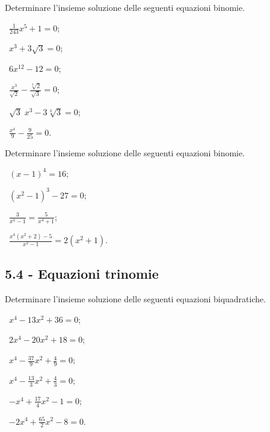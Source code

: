 \begin{esercizio}[\Ast]
 \label{ese:5.19}
Determinare l'insieme soluzione delle seguenti equazioni binomie.
\begin{multicols}{3}
 \begin{enumeratea}
 \item~$\frac 1{243}x^5+1=0$;
 \item~$x^3+3\sqrt 3=0$;
 \item~$6x^{12}-12=0$;
 \item~$\frac{x^3}{\sqrt 2}-\frac{\sqrt[3]2}{\sqrt 3}=0$;
 \item~$\sqrt 3\;x^3-3\sqrt[3]3=0$;
 \item~$\frac{x^4} 9-\frac 9{25}=0$.
 \end{enumeratea}
 \end{multicols}
\end{esercizio}

\begin{esercizio}
\label{ese:5.20}
Determinare l'insieme soluzione delle seguenti equazioni binomie.
\begin{multicols}{2}
 \begin{enumeratea}
 \item~$(x-1)^4=16$;
 \item~$(x^2-1)^3-27=0$;
 \item~$ \frac 3{x^4-1}=\frac 5{x^4+1} $;
 \item~$ \frac{x^4(x^2+2)-5}{x^2-1}=2(x^2+1) $.
 \end{enumeratea}
 \end{multicols}
\end{esercizio}

\subsection*{5.4 - Equazioni trinomie}

\begin{esercizio}[\Ast]
\label{ese:5.21}
Determinare l'insieme soluzione delle seguenti equazioni biquadratiche.
\begin{multicols}{3}
 \begin{enumeratea}
 \item~$x^4-13x^2+36=0$;
 \item~$2x^4-20x^2+18=0$;
 \item~$x^4-\frac{37} 9x^2+\frac 4 9=0$;
 \item~$x^4-\frac{13} 3x^2+\frac 4 3=0$;
 \item~$-x^4+\frac{17} 4x^2-1=0$;
 \item~$-2x^4+\frac{65} 2x^2-8=0$.
 \end{enumeratea}
\end{multicols}
\end{esercizio}

